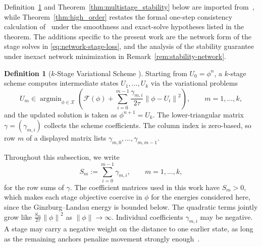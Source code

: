 \documentclass[11pt,letterpaper]{article}
\theoremstyle{plain}
\theoremstyle{definition}
\newtheorem{definition}{Definition}[section]
\newcommand{\norm}[1]{\left\| #1 \right\|}
\newcommand{\E}{\mathcal{F}}
\newcommand{\X}{\mathcal{X}}
\newcommand{\argmin}{\mathop{\mathrm{argmin}}}
\begin{document}
Definition~\ref{def:k_stage} and Theorem~\ref{thm:multistage_stability} below are imported from~\cite{Zaitzeff2020}, while Theorem~\ref{thm:high_order} restates the formal one-step consistency calculation of~\cite[Proposition~3.1 and \S 4]{Zaitzeff2020} under the smoothness and exact-solve hypotheses listed in the theorem. The additions specific to the present work are the network form of the stage solves in \eqref{eq:network-stage-loss}, and the analysis of the stability guarantee under inexact network minimization in Remark~\ref{rem:stability-network}.

\begin{definition}[$k$-Stage Variational Scheme {\cite{Zaitzeff2020}}]\label{def:k_stage}
Starting from $U_0=\phi^n$, a $k$-stage scheme computes intermediate states $U_1,\ldots,U_k$ via the variational problems
\begin{equation}
U_m
\in
\argmin_{\phi\in\X}
\left(
\E(\phi)
+
\sum_{i=0}^{m-1}
\frac{\gamma_{m,i}}{2\tau}
\norm{\phi-U_i}^2
\right),
\qquad m=1,\ldots,k,
\label{eq:k_stage_problem}
\end{equation}
and the updated solution is taken as $\phi^{n+1}=U_k$. The lower-triangular matrix $\gamma=(\gamma_{m,i})$ collects the scheme coefficients. The column index is zero-based, so row $m$ of a displayed matrix lists $\gamma_{m,0},\ldots,\gamma_{m,m-1}$.
\end{definition}

Throughout this subsection, we write
\begin{equation}
S_m := \sum_{i=0}^{m-1}\gamma_{m,i}, \qquad m=1,\ldots,k,
\label{eq:row-sum}
\end{equation}
for the row sums of $\gamma$. The coefficient matrices used in this work have $S_m>0$, which makes each stage objective coercive in $\phi$ for the energies considered here, since the Ginzburg--Landau energy is bounded below. The quadratic terms jointly grow like $\tfrac{S_m}{2\tau}\norm{\phi}^2$ as $\norm{\phi}\to\infty$. Individual coefficients $\gamma_{m, i}$ may be negative. A stage may carry a negative weight on the distance to one earlier state, as long as the remaining anchors penalize movement strongly enough~\cite{Zaitzeff2020}.
\end{document}

